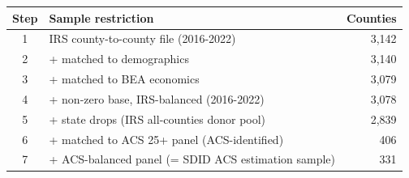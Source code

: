 \begin{tabular}{clr}
\toprule
Step & Sample restriction & Counties \\
\midrule
1 & IRS county-to-county file (2016-2022) &     3,142 \\
2 & + matched to demographics &     3,140 \\
3 & + matched to BEA economics &     3,079 \\
4 & + non-zero base, IRS-balanced (2016-2022) &     3,078 \\
5 & + state drops (IRS all-counties donor pool) &     2,839 \\
6 & + matched to ACS 25+ panel (ACS-identified) &       406 \\
7 & + ACS-balanced panel (= SDID ACS estimation sample) &       331 \\
\bottomrule
\end{tabular}
